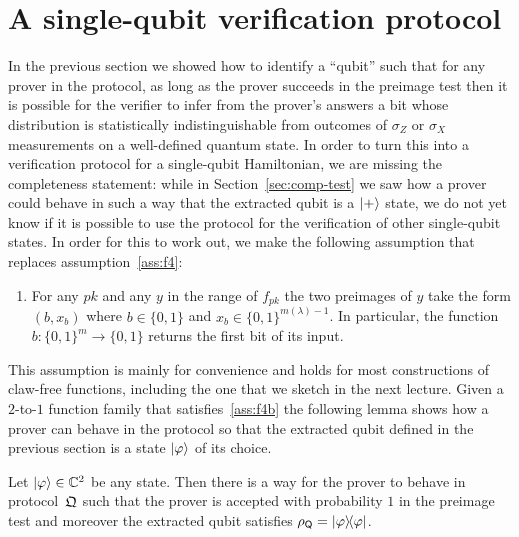 \section{A single-qubit verification protocol}

In the previous section we showed how to identify a ``qubit'' such that for any prover in the protocol, as long as the prover succeeds in the preimage test then it is possible for the verifier to infer from the prover's answers a bit whose distribution is statistically indistinguishable from outcomes of $\sigma_Z$ or $\sigma_X$ measurements on a well-defined quantum state. In order to turn this into a verification protocol for a single-qubit Hamiltonian, we are missing the completeness statement: while in Section~\ref{sec:comp-test} we saw how a prover could behave in such a way that the extracted qubit is a $|+\rangle$ state, we do not yet know if it is possible to use the protocol for the verification of other single-qubit states. In order for this to work out, we make the following assumption that replaces assumption~\ref{ass:f4}:
\begin{enumerate}[label=(\textbf{F.4'})]
\item\label{ass:f4b} For any $pk$ and any $y$ in the range of $f_{pk}$ the two preimages of $y$ take the form $(b,x_b)$ where $b\in\{0,1\}$ and $x_b \in \{0,1\}^{m(\lambda)-1}$. In particular, the function $b:\{0,1\}^m \to \{0,1\}$ returns the first bit of its input. 
\end{enumerate}
This assumption is mainly for convenience and holds for most constructions of claw-free functions, including the one that we sketch in the next lecture. Given a $2$-to-$1$ function family that satisfies~\ref{ass:f4b} the following lemma shows how a prover can behave in the protocol so that the extracted qubit defined in the previous section is a state $|\varphi\rangle$ of its choice. 

\begin{lemma}\label{lem:oq-completeness}
Let $|\varphi\rangle\in\mathbb{C}^2$ be any state. Then there is a way for the prover to behave in protocol~$\mathfrak{Q}$ such that the prover is accepted with probability $1$ in the preimage test and moreover the extracted qubit satisfies $\rho_{\textsf{Q}} = |\varphi\rangle\!\langle\varphi|$. 
\end{lemma}

